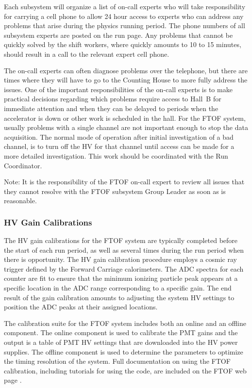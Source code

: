 \documentclass[12pt]{article}
\begin{document}
Each subsystem will organize a list of on-call experts who will take responsibility for carrying
a cell phone to allow 24 hour access to experts who can address any problems that arise during
the physics running period. The phone numbers of all subsystem experts are posted on the run page. 
Any problems that cannot be quickly solved by the shift workers, where quickly amounts to 10 to 15 
minutes, should result in a call to the relevant expert cell phone. 

The on-call experts can often diagnose problems over the telephone, but there are times where they
will have to go to the Counting House to more fully address the issues. One of the important
responsibilities of the on-call experts is to make practical decisions regarding which problems 
require access to Hall~B for immediate attention and when they can be delayed to periods when the 
accelerator is down or other work is scheduled in the hall. For the FTOF system, usually problems 
with a single channel are not important enough to stop the data acquisition. The normal mode of 
operation after initial investigation of a bad channel, is to turn off the HV for that channel 
until access can be made for a more detailed investigation. This work should be coordinated with
the Run Coordinator.

Note: It is the responsibility of the FTOF on-call expert to review all issues that they cannot
resolve with the FTOF subsystem Group Leader as soon as is reasonable.

\subsubsection{HV Gain Calibrations}
\label{gain-calib}

The HV gain calibrations for the FTOF system are typically completed before the start of each run
period, as well as several times during the run period when there is opportunity. The HV gain 
calibration procedure employs a cosmic ray trigger defined by the Forward Carriage calorimeters. 
The ADC spectra for each counter are fit to ensure that the minimum ionizing particle peak appears 
at a specific location in the ADC range corresponding to a specific gain. The end result of the 
gain calibration amounts to adjusting the system HV settings to position the ADC peaks at their 
assigned locations.

The calibration suite for the FTOF system includes both an online and an offline component. The
online component is used to calibrate the PMT gains and the output is a table of PMT HV settings
that are downloaded into the HV power supplies. The offline component is used to determine the
parameters to optimize the timing resolution of the system. Full documentation on using the
FTOF calibration, including tutorials for using the code, are included on the FTOF web page
\cite{ftof-web}.
\end{document}
